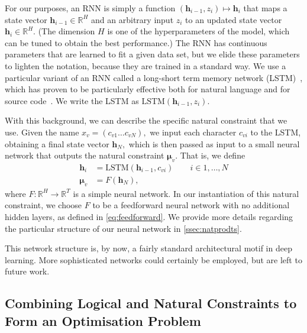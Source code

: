 \documentclass[acmsmall, review, anonymous]{acmart}\settopmatter{printfolios=true,printccs=false,printacmref=false}
\newcommand{\margincomment}[2]{\marginpar{\scriptsize\color{Maroon}#1 says: #2}}
\newcommand{\ivp}[1]{\margincomment{IVP}{#1}}
\begin{document}
For our purposes, an RNN is simply a function $(\bm{h}_{i-1}, z_i) \mapsto \bm{h}_{i}$
that maps a state vector $\bm{h}_{i-1} \in \mathbb{R}^H$
and an arbitrary input $z_i$ to an updated state vector $\bm{h}_{i}  \in \mathbb{R}^H$.
(The dimension $H$ is one of the hyperparameters of the model, which can be tuned
to obtain the best performance.)
The RNN has continuous parameters that are learned to fit a given data set,
but we elide these parameters to lighten the notation, because they are trained in a standard way.
We use a particular variant of an RNN called a
long-short term memory network (LSTM)~\cite{hochreiter97},
which has proven to be particularly effective both for natural language
and for source code~\cite{sundermeyer2012,melis17,white2015,dam16}.
We write the LSTM as $\text{LSTM}(\bm{h}_{i-1}, z_i)$.

With this background, we can describe the specific natural constraint that we use.
Given the name $x_v = (c_{v1} \ldots c_{vN}),$ we input each character $c_{vi}$ to the LSTM,
obtaining a final state vector $\bm{h}_N,$ which is then passed as input to a small
neural network that outputs the natural constraint $\bm{\mu}_v$.
That is, we define
\begin{subequations}\label{eq:lstm}
	\begin{align}
		\bm{h}_i   & = \text{LSTM}(\bm{h}_{i-1}, c_{vi}) \qquad i \in 1, \ldots, N \\
		\bm{\mu}_v & = F(\bm{h}_N), \label{eq:lstmb}
	\end{align}
\end{subequations}
where $F: \mathbb{R}^H \rightarrow \mathbb{R}^T$ is a simple neural network.
In our instantiation of this natural constraint, we choose $F$ to be a feedforward neural network with
no additional hidden layers, as defined in \eqref{eq:feedforward}.
We provide more details regarding the particular structure of our neural network in \cref{ssec:natprodts}.

This network structure is, by now, a fairly standard architectural motif in deep learning.
More sophisticated networks could certainly be employed, but are left to future work.

\subsection{Combining Logical and Natural Constraints to Form an Optimisation Problem}~\label{ssec:optimisation}

\end{document}
